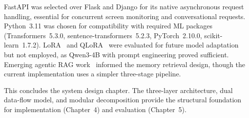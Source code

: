 FastAPI was selected over Flask and Django for its native asynchronous request handling, essential for concurrent screen monitoring and conversational requests. Python~3.11 was chosen for compatibility with required ML packages (Transformers~5.3.0, sentence-transformers~5.2.3, PyTorch~2.10.0, scikit-learn~1.7.2). LoRA~\cite{hu2022} and QLoRA~\cite{dettmers2023} were evaluated for future model adaptation but not employed, as Qwen3-4B with prompt engineering proved sufficient. Emerging agentic RAG work~\cite{lin2025, xu2024} informed the memory retrieval design, though the current implementation uses a simpler three-stage pipeline.

\bigskip

This concludes the system design chapter. The three-layer architecture, dual data-flow model, and modular decomposition provide the structural foundation for implementation (Chapter~4) and evaluation (Chapter~5).
